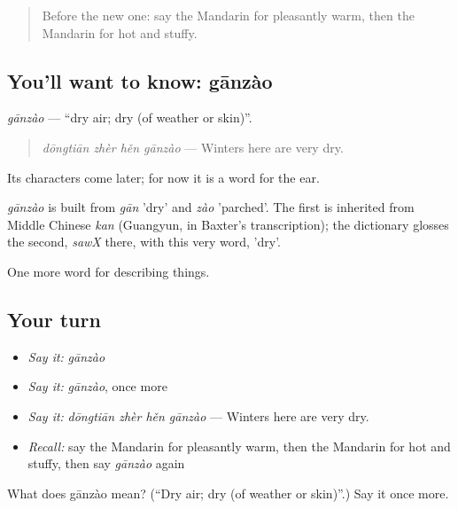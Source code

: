 \label{lesson:ZH-C218-ganzao}



\begin{quote}
Before the new one: say the Mandarin for pleasantly warm, then the Mandarin for hot and stuffy.
\end{quote}

\subsection*{You'll want to know: gānzào}
\emph{gānzào} — \textquotedblleft{}dry air; dry (of weather or skin)\textquotedblright{}.

\begin{quote}
\emph{dōngtiān zhèr hěn gānzào} — Winters here are very dry.
\end{quote}

Its characters come later; for now it is a word for the ear.

\begin{cousinweb}
\emph{gānzào} is built from \emph{gān} 'dry' and \emph{zào} 'parched'. The first is inherited from Middle Chinese \emph{kan} (Guangyun, in Baxter's transcription); the dictionary glosses the second, \emph{sawX} there, with this very word, 'dry'.
\end{cousinweb}

\begin{grammarlens}[title={What you've built}]
One more word for describing things.
\end{grammarlens}

\subsection*{Your turn}
\begin{itemize}
\raggedright
  \item \emph{Say it:} \emph{gānzào}
  \item \emph{Say it:} \emph{gānzào}, once more
  \item \emph{Say it:} \emph{dōngtiān zhèr hěn gānzào} — Winters here are very dry.
  \item \emph{Recall:} say the Mandarin for pleasantly warm, then the Mandarin for hot and stuffy, then say \emph{gānzào} again
\end{itemize}

\begin{tcolorbox}[breakable,colback=teal!4,colframe=teal!35!black,title={Before you move on}]
What does gānzào mean? (\textquotedblleft{}Dry air; dry (of weather or skin)\textquotedblright{}.) Say it once more.
\end{tcolorbox}
